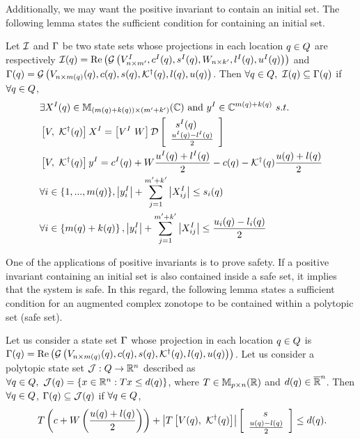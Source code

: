 Additionally, we may want the positive invariant to contain an initial
set.  The following lemma states the sufficient condition for
containing an initial set.
\begin{lemma}
  Let $\mathcal{I}$ and $\Gamma$ be two state sets whose projections in each location
  $q\in Q$ are respectively $\mathcal{I}(q)=\operatorname{\operatorname{Re}}\left(\mathcal{G}\left(V^I_{n\times
      m^\prime },c^I(q),s^I(q),W_{n\times
      k^\prime},l^I(q),u^I(q)\right)\right)$ and $\Gamma(q) =
  \mathcal{G}\left(V_{n\times m(q)}(q),c(q),s(q),\mathcal{K}^\dagger(q),l(q),u(q)\right)$.
  Then
  $\forall q\in Q,~\mathcal{I}(q)\subseteq \Gamma(q)$
  if $\forall q\in Q$, 
\begin{align}
\begin{split}
& \exists X^I(q)\in\mathbb{M}_{(m(q)+k(q))\times (m^\prime+k^\prime)}(\mathbb{\mathbb{C}})~\text{and}~y^I\in\mathbb{C}^{m(q)+k(q)}~s.t.\\
& \left[V,~\mathcal{K}^\dagger(q)\right]X^I = \left[V^I~W\right]\mathcal{D}\left[\begin{array}{l}{\hspace{0.5em}s^I(q)}\\{\frac{u^I(q)-l^I(q)}{2}} \end{array}\right]\\
& \left[V,~\mathcal{K}^\dagger(q)\right]y^I =
c^I(q)+W\frac{u^I(q)+l^I(q)}{2}-c(q)-\mathcal{K}^\dagger(q)\frac{u(q)+l(q)}{2}\\
& \forall i\in\{1,...,m(q)\},
\left|y_i^I\right|+\sum_{j=1}^{m^\prime+k^\prime}\left|X_{ij}^I\right|\leq s_i(q)\\
& \forall
i\in\left\{m(q)+k(q)\right\},\left|y_i^I\right|+\sum_{j=1}^{m^\prime+k^\prime}\left|X_{ij}^I\right|\leq \frac{u_i(q)-l_i(q)}{2}
\end{split}
\end{align}
\end{lemma}

One of the applications of positive invariants is to prove safety.  If
a positive invariant containing an initial set is also contained
inside a safe set, it implies that the system is safe.  In this
regard, the following lemma states a sufficient condition for an
augmented complex zonotope to be contained within a polytopic
set (safe set).

\begin{lemma}
  Let us consider a state set $\Gamma$ whose projection in each
  location $q \in Q$ is $\Gamma(q) =
  \operatorname{\operatorname{Re}}\left(\mathcal{G}\left(V_{n\times m(q)}(q),c(q),s(q),\mathcal{K}^\dagger(q),l(q),u(q)\right)\right)$.
  Let us consider a polytopic state set
  $\mathcal{J}:Q\rightarrow\mathbb{R}^n$ described as $\forall
  q\in Q,~\mathcal{J}(q)=\left\{x\in\mathbb{R}^n:Tx\leq
  d(q)\right\}$, where $T\in\mathbb{M}_{p\times n}(\mathbb{R})$ and
  $d(q)\in\mathbb{\overline{R}}^n$.  Then $\forall q\in Q$,
  $\Gamma(q)\subseteq \mathcal{J}(q)$ if $\forall
  q\in Q$,
\begin{align}~\label{eqn:safe-contain}
T\left(c+W\left(\frac{u(q)+l(q)}{2}\right)\right)+\left|T\left[V(q),~\mathcal{K}^\dagger(q)\right]\right|\left[\begin{array}{l}{\hspace{1.5em}s}\\{\frac{u(q)-l(q)}{2}} \end{array}\right]\leq d(q).
\end{align}
\end{lemma}

